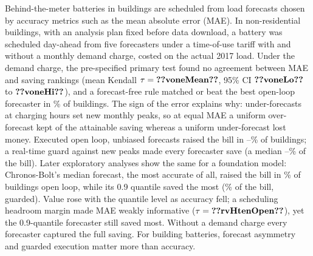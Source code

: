 Behind-the-meter batteries in buildings are scheduled from load forecasts chosen by accuracy metrics such as the mean absolute error (MAE). In  non-residential buildings, with an analysis plan fixed before data download, a battery was scheduled day-ahead from five forecasters under a time-of-use tariff with and without a monthly demand charge, costed on the actual 2017 load. Under the demand charge, the pre-specified primary test found no agreement between MAE and saving rankings (mean Kendall $\tau=\res{voneMean}$, 95\% CI $\res{voneLo}$ to $\res{voneHi}$), and a forecast-free rule matched or beat the best open-loop forecaster in \% of buildings. The sign of the error explains why: under-forecasts at charging hours set new monthly peaks, so at equal MAE a uniform over-forecast kept  of the attainable saving whereas a uniform under-forecast lost money. Executed open loop, unbiased forecasts raised the bill in --\% of buildings; a real-time guard against new peaks made every forecaster save (a median --\% of the bill). Later exploratory analyses show the same for a foundation model: Chronos-Bolt's median forecast, the most accurate of all, raised the bill in \% of buildings open loop, while its 0.9 quantile saved the most (\% of the bill, guarded). Value rose with the quantile level as accuracy fell; a scheduling headroom margin made MAE weakly informative ($\tau=\res{rvHtenOpen}$), yet the 0.9-quantile forecaster still saved most. Without a demand charge every forecaster captured the full saving. For building batteries, forecast asymmetry and guarded execution matter more than accuracy.
